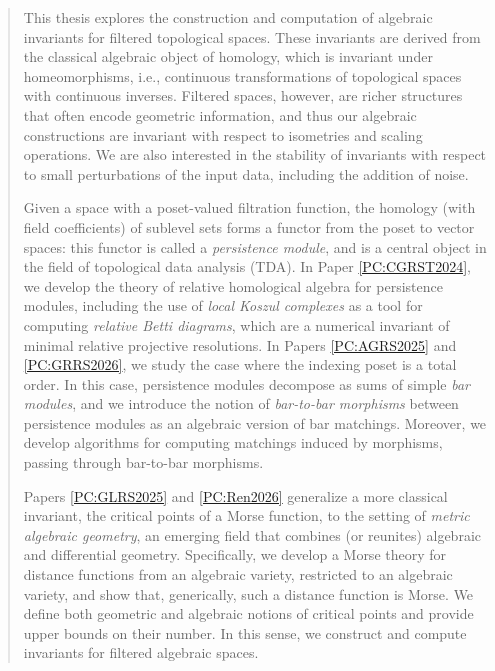 
\frontmatter

\maketitle
\makecopyright


\begin{abstract}
  This thesis explores the construction and computation of algebraic invariants for filtered topological spaces. These invariants are derived from the classical algebraic object of homology, which is invariant under homeomorphisms, i.e., continuous transformations of topological spaces with continuous inverses. Filtered spaces, however, are richer structures that often encode geometric information, and thus our algebraic constructions are invariant with respect to isometries and scaling operations. We are also interested in the stability of invariants with respect to small perturbations of the input data, including the addition of noise.
  
  Given a space with a poset-valued filtration function, the homology (with field coefficients) of sublevel sets forms a functor from the poset to vector spaces: this functor is called a \emph{persistence module}, and is a central object in the field of topological data analysis (TDA). In Paper \ref{PC:CGRST2024}, we develop the theory of relative homological algebra for persistence modules, including the use of \emph{local Koszul complexes} as a tool for computing \emph{relative Betti diagrams}, which are a numerical invariant of minimal relative projective resolutions. In Papers \ref{PC:AGRS2025} and \ref{PC:GRRS2026}, we study the case where the indexing poset is a total order. In this case, persistence modules decompose as sums of simple \emph{bar modules}, and we introduce the notion of \emph{bar-to-bar morphisms} between persistence modules as an algebraic version of bar matchings. Moreover, we develop algorithms for computing matchings induced by morphisms, passing through bar-to-bar morphisms.
  
  Papers \ref{PC:GLRS2025} and \ref{PC:Ren2026} generalize a more classical invariant, the critical points of a Morse function, to the setting of \emph{metric algebraic geometry}, an emerging field that combines (or reunites) algebraic and differential geometry. Specifically, we develop a Morse theory for distance functions from an algebraic variety, restricted to an algebraic variety, and show that, generically, such a distance function is Morse. We define both geometric and algebraic notions of critical points and provide upper bounds on their number. In this sense, we construct and compute invariants for filtered algebraic spaces.
\end{abstract}

